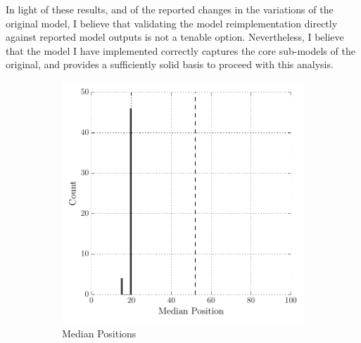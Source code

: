 In light of these results, and of the reported changes in the variations of the original model, I believe that validating the model reimplementation directly against reported model outputs is not a tenable option. Nevertheless, I believe that the model I have implemented correctly captures the core sub-models of the original, and provides a sufficiently solid basis to proceed with this analysis.

\begin{figure}
    \centering
    \begin{subfigure}{0.49\textwidth}
        \includegraphics[width=\textwidth]{BDM_Reproduction/Figures/Scholz_ChinaModel}
        \caption{\citet{scholz_2011} Median Positions}
    \end{subfigure}
    \begin{subfigure}{0.49\textwidth}

\end{subfigure}
\end{figure}
